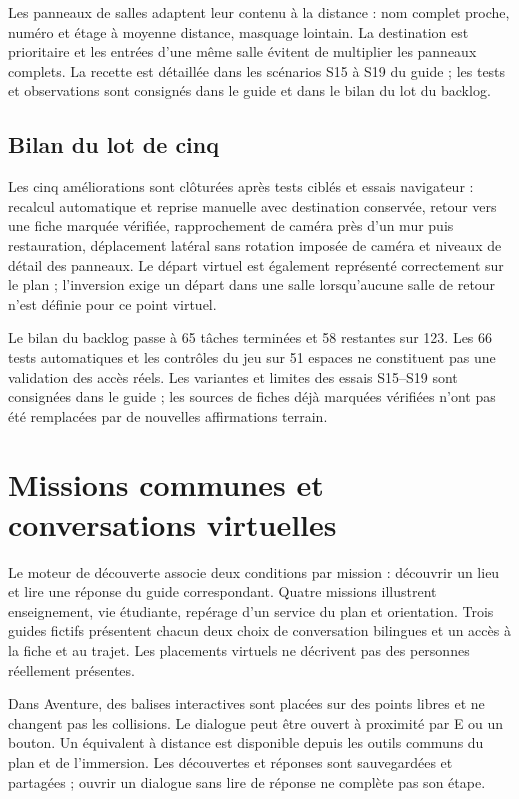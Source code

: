 \documentclass[11pt,a4paper]{article}
\begin{document}
Les panneaux de salles adaptent leur contenu à la distance : nom complet proche, numéro et étage à moyenne distance, masquage lointain. La destination est prioritaire et les entrées d'une même salle évitent de multiplier les panneaux complets. La recette est détaillée dans les scénarios S15 à S19 du guide ; les tests et observations sont consignés dans le guide et dans le bilan du lot du backlog.

\subsection{Bilan du lot de cinq}
Les cinq améliorations sont clôturées après tests ciblés et essais navigateur : recalcul automatique et reprise manuelle avec destination conservée, retour vers une fiche marquée vérifiée, rapprochement de caméra près d'un mur puis restauration, déplacement latéral sans rotation imposée de caméra et niveaux de détail des panneaux. Le départ virtuel est également représenté correctement sur le plan ; l'inversion exige un départ dans une salle lorsqu'aucune salle de retour n'est définie pour ce point virtuel.

Le bilan du backlog passe à 65 tâches terminées et 58 restantes sur 123. Les 66 tests automatiques et les contrôles du jeu sur 51 espaces ne constituent pas une validation des accès réels. Les variantes et limites des essais S15--S19 sont consignées dans le guide ; les sources de fiches déjà marquées vérifiées n'ont pas été remplacées par de nouvelles affirmations terrain.

\section{Missions communes et conversations virtuelles}
Le moteur de découverte associe deux conditions par mission : découvrir un lieu et lire une réponse du guide correspondant. Quatre missions illustrent enseignement, vie étudiante, repérage d'un service du plan et orientation. Trois guides fictifs présentent chacun deux choix de conversation bilingues et un accès à la fiche et au trajet. Les placements virtuels ne décrivent pas des personnes réellement présentes.

Dans Aventure, des balises interactives sont placées sur des points libres et ne changent pas les collisions. Le dialogue peut être ouvert à proximité par E ou un bouton. Un équivalent à distance est disponible depuis les outils communs du plan et de l'immersion. Les découvertes et réponses sont sauvegardées et partagées ; ouvrir un dialogue sans lire de réponse ne complète pas son étape.
\end{document}
